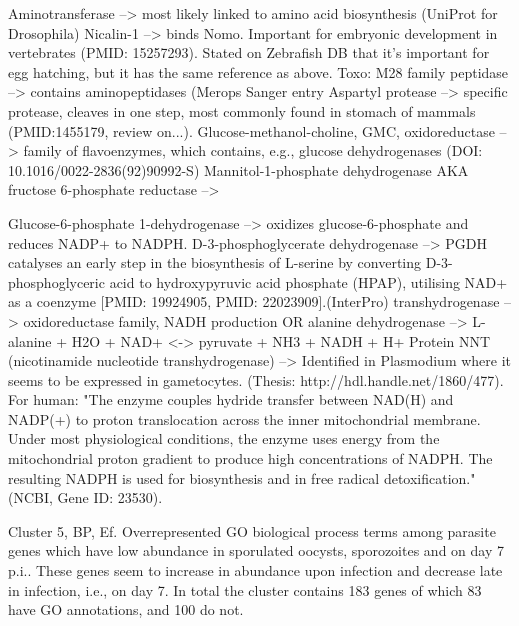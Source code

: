 \documentclass{article}
\begin{document}
  Aminotransferase --> most likely linked to amino acid biosynthesis (UniProt for 
Drosophila)
  Nicalin-1 --> binds Nomo. Important for embryonic development in vertebrates (PMID:
15257293). Stated on Zebrafish DB that it's important for egg hatching, but it
has the same reference as above. 
  Toxo: M28 family peptidase --> contains aminopeptidases (Merops Sanger entry
  Aspartyl protease --> specific protease, cleaves in one step, most commonly
found in stomach of mammals (PMID:1455179, review on...).
  Glucose-methanol-choline, GMC, oxidoreductase --> family of flavoenzymes, which
contains, e.g., glucose dehydrogenases (DOI: 10.1016/0022-2836(92)90992-S)
  Mannitol-1-phosphate dehydrogenase AKA fructose 6-phosphate reductase -->

  Glucose-6-phosphate 1-dehydrogenase --> oxidizes glucose-6-phosphate and reduces
NADP+ to NADPH. 
  D-3-phosphoglycerate dehydrogenase --> PGDH catalyses an early step in the biosynthesis of L-serine by converting 
D-3-phosphoglyceric acid to hydroxypyruvic acid phosphate (HPAP), utilising 
NAD+ as a coenzyme [PMID: 19924905, PMID: 22023909].(InterPro)
     transhydrogenase --> oxidoreductase family, NADH production
OR   alanine dehydrogenase --> L-alanine + H2O + NAD+ <-> pyruvate + NH3 + NADH + H+
    Protein NNT (nicotinamide nucleotide transhydrogenase) -->
Identified in Plasmodium where it seems to be expressed in gametocytes.
(Thesis: http://hdl.handle.net/1860/477). For human: "The enzyme couples hydride 
transfer between NAD(H) and NADP(+) to proton translocation across the inner 
mitochondrial membrane. Under most physiological conditions, the enzyme uses energy 
from the mitochondrial proton gradient to produce high concentrations of NADPH. 
The resulting NADPH is used for biosynthesis and in free radical detoxification."
(NCBI, Gene ID: 23530). 
    










  




Cluster 5, BP, Ef.
Overrepresented GO biological process terms among parasite genes which have low abundance
in sporulated oocysts, sporozoites and on day 7 p.i.. These genes seem to increase in abundance
upon infection and decrease late in infection, i.e., on day 7. In total the cluster contains 183 genes
of which 83 have GO annotations, and 100 do not.\\
 \\

\end{document}
